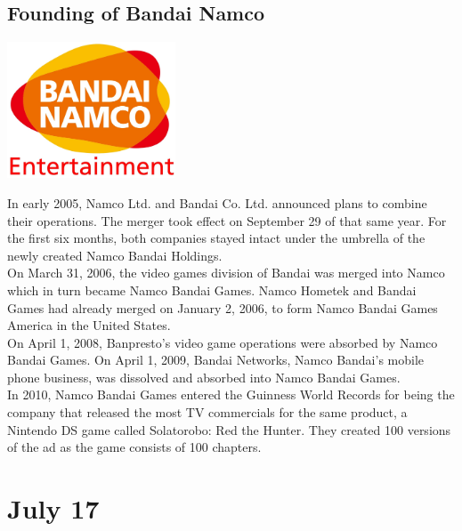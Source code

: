 \documentclass[11pt]{report}
\begin{document}
\subsection{Founding of Bandai Namco}
\vspace{2mm}\begin{center}\includegraphics[width=5cm]{./img/bandaiNamcoLogo.jpg}\end{center}
In early 2005, Namco Ltd. and Bandai Co. Ltd. announced plans to combine their operations. The merger took effect on September 29 of that same year. For the first six months, both companies stayed intact under the umbrella of the newly created Namco Bandai Holdings.\\
\indent On March 31, 2006, the video games division of Bandai was merged into Namco which in turn became Namco Bandai Games. Namco Hometek and Bandai Games had already merged on January 2, 2006, to form Namco Bandai Games America in the United States.\\
\indent On April 1, 2008, Banpresto's video game operations were absorbed by Namco Bandai Games. On April 1, 2009, Bandai Networks, Namco Bandai's mobile phone business, was dissolved and absorbed into Namco Bandai Games.\\
\indent In 2010, Namco Bandai Games entered the Guinness World Records for being the company that released the most TV commercials for the same product, a Nintendo DS game called Solatorobo: Red the Hunter. They created 100 versions of the ad as the game consists of 100 chapters.
\section{July 17}
\end{document}
